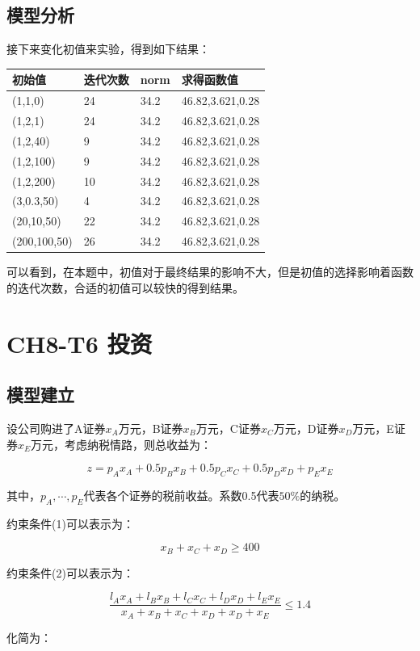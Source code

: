\documentclass{article}
\begin{document}
\subsection{模型分析}
接下来变化初值来实验，得到如下结果：

\begin{table}[H]
\centering
\begin{tabular}{|l|l|l|l|}
\hline
初始值          & 迭代次数 & norm & 求得函数值            \\ \hline
(1,1,0)      & 24   & 34.2 & 46.82,3.621,0.28 \\ \hline
(1,2,1)      & 24   & 34.2 & 46.82,3.621,0.28 \\ \hline
(1,2,40)     & 9    & 34.2 & 46.82,3.621,0.28 \\ \hline
(1,2,100)    & 9    & 34.2 & 46.82,3.621,0.28 \\ \hline
(1,2,200)    & 10   & 34.2 & 46.82,3.621,0.28 \\ \hline
(3,0.3,50)   & 4    & 34.2 & 46.82,3.621,0.28 \\ \hline
(20,10,50)   & 22   & 34.2 & 46.82,3.621,0.28 \\ \hline
(200,100,50) & 26   & 34.2 & 46.82,3.621,0.28 \\ \hline
\end{tabular}
\end{table}
可以看到，在本题中，初值对于最终结果的影响不大，但是初值的选择影响着函数的迭代次数，合适的初值可以较快的得到结果。

\section{CH8-T6 投资}
\subsection{模型建立}
设公司购进了A证券$x_A$万元，B证券$x_B$万元，C证券$x_C$万元，D证券$x_D$万元，E证券$x_E$万元，考虑纳税情路，则总收益为：

$$z=p_Ax_A+0.5p_Bx_B+0.5p_Cx_C+0.5p_Dx_D+p_Ex_E$$

其中，$p_A,\cdots,p_E$代表各个证券的税前收益。系数0.5代表$50\%$的纳税。

约束条件(1)可以表示为：

$$x_B+x_C+x_D\geq 400$$

约束条件(2)可以表示为：

$$\frac{l_Ax_A+l_Bx_B+l_Cx_C+l_Dx_D+l_Ex_E}{x_A+x_B+x_C+x_D+x_D+x_E}\leq1.4$$

化简为：
\end{document}

